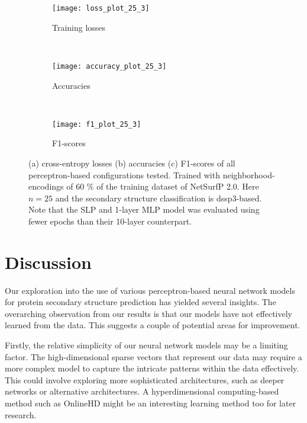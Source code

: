 \begin{figure}[H]
    \centering
    \begin{minipage}[b]{.6\textwidth}
        \begin{subfigure}[b]{\textwidth}
        \texttt{[image: loss\_plot\_25\_3]}
        \caption{Training losses}
        \label{fig:loss}
    \end{subfigure}
    \end{minipage}
    \\
    \centering
    \begin{minipage}[b]{.6\textwidth}
    \begin{subfigure}[b]{\textwidth}
        \texttt{[image: accuracy\_plot\_25\_3]}
        \caption{Accuracies}
        \label{fig:accuracy}
    \end{subfigure}
    \end{minipage}
    \\
    \centering
    \begin{minipage}[b]{.6\textwidth}
    \begin{subfigure}[b]{\textwidth}
        \texttt{[image: f1\_plot\_25\_3]}
        \caption{F1-scores}\label{fig:f1}
    \end{subfigure}
    \end{minipage}
    \caption{(a) cross-entropy losses (b) accuracies (c) F1-scores of all perceptron-based configurations tested. Trained with neighborhood-encodings of 60 \% of the training dataset of NetSurfP 2.0. Here $n=25$ and the secondary structure classification is dssp3-based. Note that the SLP and 1-layer MLP model was evaluated using fewer epochs than their 10-layer counterpart.}\label{fig:she}
    \end{figure}

\section{Discussion}
Our exploration into the use of various perceptron-based neural network models for protein secondary structure prediction has yielded several insights. The overarching observation from our results is that our models have not effectively learned from the data. This suggests a couple of potential areas for improvement.

Firstly, the relative simplicity of our neural network models may be a limiting factor. The high-dimensional sparse vectors that represent our data may require a more complex model to capture the intricate patterns within the data effectively. This could involve exploring more sophisticated architectures, such as deeper networks or alternative architectures. A hyperdimensional computing-based method such as OnlineHD might be an interesting learning method too for later research.


